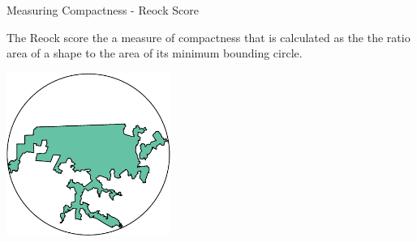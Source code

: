 \documentclass[11pt,ignorenonframetext,]{beamer}
\newenvironment{Shaded}{}{}
\newcommand{\DataTypeTok}[1]{\textcolor[rgb]{0.56,0.13,0.00}{#1}}
\newcommand{\DecValTok}[1]{\textcolor[rgb]{0.25,0.63,0.44}{#1}}
\newcommand{\KeywordTok}[1]{\textcolor[rgb]{0.00,0.44,0.13}{\textbf{#1}}}
\newcommand{\NormalTok}[1]{#1}
\newcommand{\OperatorTok}[1]{\textcolor[rgb]{0.40,0.40,0.40}{#1}}
\newcommand{\OtherTok}[1]{\textcolor[rgb]{0.00,0.44,0.13}{#1}}
\newcommand{\StringTok}[1]{\textcolor[rgb]{0.25,0.44,0.63}{#1}}
\let\oldShaded\Shaded
\let\endoldShaded\endShaded
\renewenvironment{Shaded}{\footnotesize\begin{spacing}{0.9}\oldShaded}{\endoldShaded\end{spacing}}
\begin{document}
\begin{frame}[fragile,t]{Measuring Compactness - Reock Score}
\protect\hypertarget{measuring-compactness---reock-score}{}

The Reock score the a measure of compactness that is calculated as the
the ratio area of a shape to the area of its minimum bounding circle.

\begin{Shaded}
\end{Shaded}

\begin{center}\includegraphics[width=0.4\textwidth]{Lec16_files/figure-beamer/unnamed-chunk-36-1} \end{center}

\end{frame}
\end{document}
